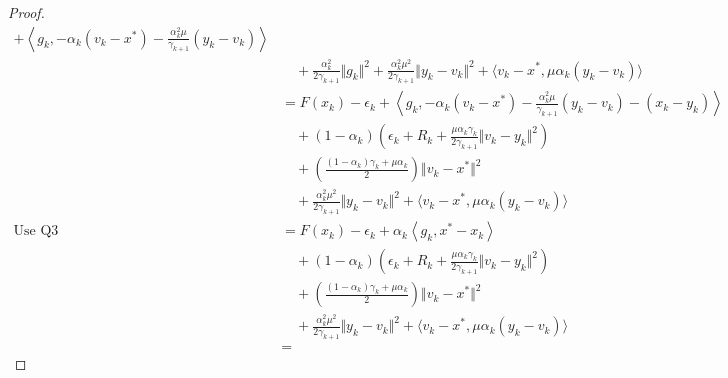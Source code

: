 \documentclass[12pt]{article}
\begin{document}
\begin{proof}
\begin{align*}
                + 
                \left\langle g_k, 
                    - \alpha_k(v_k - x^*) 
                    - \frac{\alpha_k^2\mu}{\gamma_{k + 1}}(y_k - v_k)
                \right\rangle
            \\
            & \quad 
                + \frac{\alpha_k^2}{2\gamma_{k + 1}}\Vert g_k\Vert^2
                + \frac{\alpha_k^2 \mu^2}{2\gamma_{k + 1}}\Vert y_k - v_k\Vert^2
                + \langle v_k - x^*, \mu\alpha_k(y_k - v_k)\rangle
            \\
            &= 
            F(x_k) - \epsilon_k 
            + \left\langle 
                g_k, 
                - \alpha_k(v_k - x^*) 
                - \frac{\alpha_k^2\mu}{\gamma_{k + 1}}(y_k - v_k)
                - (x_k - y_k)
            \right\rangle
            \\
            &\quad 
                + (1 - \alpha_k)
                \left(
                    \epsilon_k + R_k + 
                    \frac{\mu\alpha_k\gamma_k}{2\gamma_{k + 1}}
                    \Vert v_k - y_k\Vert^2
                \right)
            \\
            &\quad 
                + 
                \left(
                \frac{(1 - \alpha_k)\gamma_k + \mu \alpha_k}{2} 
                \right)\Vert v_k - x^*\Vert^2
            \\
            & \quad 
                + \frac{\alpha_k^2 \mu^2}{2\gamma_{k + 1}}\Vert y_k - v_k\Vert^2
                + \langle v_k - x^*, \mu\alpha_k(y_k - v_k)\rangle
            \\
            \text{Use Q3}&= 
            F(x_k) - \epsilon_k 
            + \alpha_k\left\langle 
                g_k, 
                x^* - x_k
            \right\rangle
            \\
            &\quad 
                + (1 - \alpha_k)
                \left(
                    \epsilon_k + R_k + 
                    \frac{\mu\alpha_k\gamma_k}{2\gamma_{k + 1}}
                    \Vert v_k - y_k\Vert^2
                \right)
            \\
            &\quad 
                + 
                \left(
                \frac{(1 - \alpha_k)\gamma_k + \mu \alpha_k}{2} 
                \right)\Vert v_k - x^*\Vert^2
            \\
            & \quad 
                + \frac{\alpha_k^2 \mu^2}{2\gamma_{k + 1}}\Vert y_k - v_k\Vert^2
                + \langle v_k - x^*, \mu\alpha_k(y_k - v_k)\rangle
            \\
            &= 

\end{align*}
\end{proof}
\end{document}
